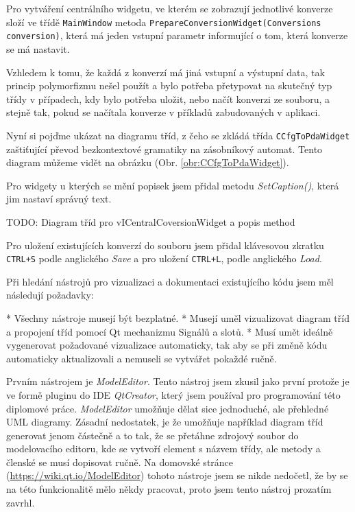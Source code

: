 Pro vytváření centrálního widgetu, ve kterém se zobrazují jednotlivé konverze složí ve třídě \texttt{MainWindow} metoda \texttt{PrepareConversionWidget(Conversions conversion)}, která má jeden vstupní parametr informující o tom, která konverze se má nastavit.

Vzhledem k tomu, že každá z konverzí má jiná vstupní a výstupní data, tak princip polymorfizmu nešel použít a bylo potřeba přetypovat na skutečný typ třídy v případech, kdy bylo potřeba uložit, nebo načít konverzi ze souboru, a stejně tak, pokud se načítala konverze v příkladů zabudovaných v aplikaci.


Nyní si pojďme ukázat na diagramu tříd, z čeho se zkládá třída \texttt{CCfgToPdaWidget} zaštiťující převod bezkontextové gramatiky na zásobníkový automat. Tento diagram můžeme vidět na obrázku (Obr. \ref{obr:CCfgToPdaWidget}).


Pro widgety u kterých se mění popisek jsem přidal metodu \textit{SetCaption()}, která jim nastaví správný text.

TODO: Diagram tříd pro vICentralCoversionWidget a popis method 


Pro uložení existujících konverzí do souboru jsem přidal klávesovou zkratku \texttt{CTRL+S} podle anglického \textit{Save} a pro uložení \texttt{CTRL+L}, podle anglického \textit{Load}.


Při hledání nástrojů pro vizualizaci a dokumentaci existujícího kódu jsem měl následují požadavky:

* Všechny nástroje musejí být bezplatné.
* Musejí uměl vizualizovat diagram tříd a propojení tříd pomocí Qt mechanizmu Signálů a slotů.
* Musí umět ideálně vygenerovat požadované vizualizace automaticky, tak aby se při změně kódu automaticky aktualizovali a nemuseli se vytvářet pokaždé ručně.


Prvním nástrojem je \textit{ModelEditor}. Tento nástroj jsem zkusil jako první protože je ve formě pluginu do IDE \textit{QtCreator}, který jsem používal pro programování této diplomové práce. \textit{ModelEditor} umožňuje dělat sice jednoduché, ale přehledné UML diagramy. Zásadní nedostatek, je že umožňuje například diagram tříd generovat jenom částečně a to tak, že se přetáhne zdrojový soubor do modelovacího editoru, kde se vytvoří element s názvem třídy, ale metody a členské se musí dopisovat ručně. Na domovské stránce (\url{https://wiki.qt.io/ModelEditor}) tohoto nástroje jsem se nikde nedočetl, že by se na této funkcionalitě mělo někdy pracovat, proto jsem tento nástroj prozatím zavrhl.

